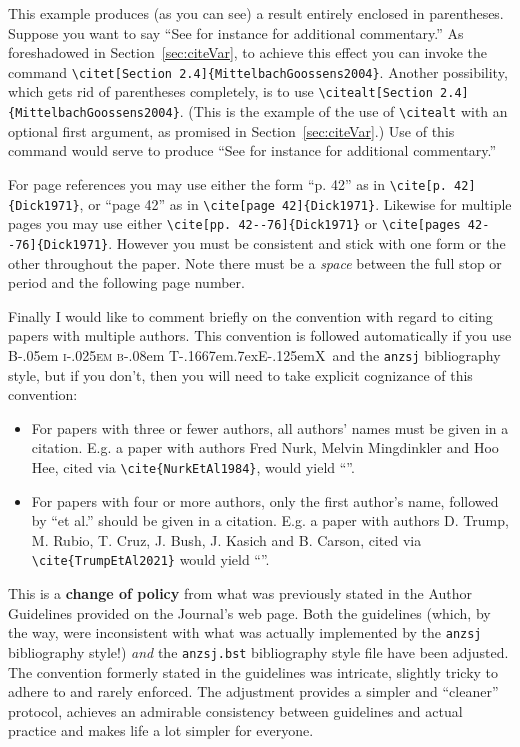 \documentclass[times, doublespace]{anzsauth}
\newcommand\BibTeX{{\rmfamily B\kern-.05em \textsc{i\kern-.025em b}\kern-.08em
T\kern-.1667em\lower.7ex\hbox{E}\kern-.125emX}}
\begin{document}
This example produces (as you can see) a result entirely enclosed
in parentheses.  Suppose you want to say ``See for instance
\citet[Section 2.4]{MittelbachGoossens2004} for additional
commentary.''  As foreshadowed in Section~\ref{sec:citeVar}, to
achieve this effect you can invoke the command
\verb!\citet[Section 2.4]{MittelbachGoossens2004}!.  Another
possibility, which gets rid of parentheses completely, is to use
\verb!\citealt[Section 2.4]{MittelbachGoossens2004}!.  (This is
the example of the use of \verb!\citealt! with an optional first
argument, as promised in Section~\ref{sec:citeVar}.)  Use of this
command would serve to produce ``See for instance \citealt[Section
2.4]{MittelbachGoossens2004} for additional commentary.''

For page references you may use either the form ``p. 42'' as in
\verb!\cite[p. 42]{Dick1971}!, or ``page 42'' as in
\verb!\cite[page 42]{Dick1971}!.  Likewise for multiple pages you may
use either \verb!\cite[pp. 42--76]{Dick1971}!
or \verb!\cite[pages 42--76]{Dick1971}!.
However you must be consistent and stick with one form or the
other throughout the paper.  Note there must be a \emph{space}
between the full stop or period and the following page number.

Finally I would like to comment briefly on the convention with
regard to citing papers with multiple authors.  This convention
is followed automatically if you use \BibTeX\ and the \texttt{anzsj}
bibliography style, but if you don't, then you will
need to take explicit cognizance of this convention:
\begin{itemize}
\item For papers with three or fewer authors, all authors' names
must be given in a citation.  E.g. a paper with authors Fred Nurk,
Melvin Mingdinkler and Hoo Hee, cited via \verb!\cite{NurkEtAl1984}!,
would yield ``\cite{NurkEtAl1984}''.
\item For papers with four or more authors, only the first
author's name, followed by ``et al.'' should be given in a citation.
E.g. a paper with authors D. Trump, M. Rubio, T. Cruz, J. Bush, J. Kasich
and B. Carson, cited via \verb!\cite{TrumpEtAl2021}! 
would yield ``\cite{TrumpEtAl2021}''. 
\end{itemize}

This is a \textbf{change of policy} from what was previously stated
in the Author Guidelines provided on the Journal's web page.
Both the guidelines (which, by the way, were inconsistent with
what was actually implemented by the \texttt{anzsj} bibliography
style!) \emph{and} the \texttt{anzsj.bst} bibliography style file
have been adjusted.  The convention formerly stated in the guidelines
was intricate, slightly tricky to adhere to and rarely enforced.
The adjustment provides a simpler and ``cleaner'' protocol, achieves
an admirable consistency between guidelines and actual practice
and makes life a lot simpler for everyone.
\end{document}
